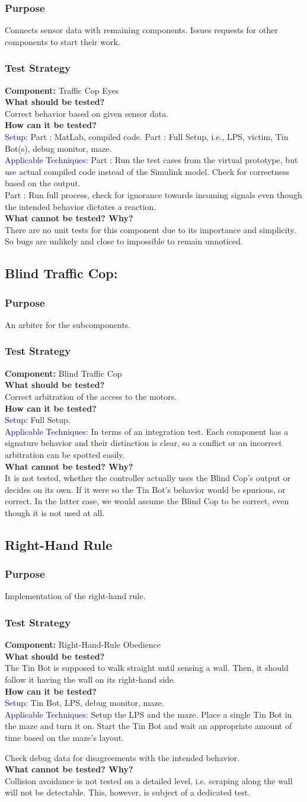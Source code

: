 \documentclass[a4paper,parskip,headheight=38pt]{scrartcl} %
\newcommand*{\rom}[1]{\uppercase\expandafter{\romannumeral #1\relax}}
\newcommand{\teststrat}[5]{
    \subsubsection{Test Strategy}
	\textbf{Component:} #1 \\
	\noindent\textbf{What should be tested?} \\
    \noindent #2 \\
	\noindent\textbf{How can it be tested?} \\
    \noindent\textcolor{blue}{Setup:} #3 \\
    \noindent\textcolor{blue}{Applicable Techniques:} #4 \\
	\noindent\textbf{What cannot be tested? Why?} \\
    \noindent #5
}
\newcommand{\ie}{i.e.}
\begin{document}
\subsubsection{Purpose}
Connects sensor data with remaining components. Issues requests for other components to start their work.
\teststrat{Traffic Cop Eyes}{
    Correct behavior based on given sensor data.
}{
    Part \rom{1}: MatLab, compiled code. Part \rom{2}: Full Setup, \ie, LPS,
    victim, Tin Bot(s), debug monitor, maze.
}{
    Part \rom{1}: Run the test cases from the virtual prototype, but use actual
    compiled code instead of the Simulink model. Check for correctness based
    on the output. \\
    Part \rom{2}: Run full process, check for ignorance towards incoming signals
    even though the intended behavior dictates a reaction. 
}{
    There are no unit tests for this component due to its importance and
    simplicity. So bugs are unlikely and close to impossible to remain
    unnoticed.
}
%
\subsection{Blind Traffic Cop:}
\subsubsection{Purpose}
An arbiter for the subcomponents.
\teststrat{Blind Traffic Cop}{
    Correct arbitration of the access to the motors.
}{
    Full Setup.
}{
    In terms of an integration test. Each component has a signature behavior and
    their distinction is clear, so a conflict or an incorrect arbitration can be
    spotted easily.
}{
    It is not tested, whether the controller actually uses the Blind Cop's
    output or decides on its own. If it were so the Tin Bot's behavior would be
    spurious, or correct. In the latter case, we would assume the Blind Cop to
    be correct, even though it is not used at all.
}
%
\subsection{Right-Hand Rule}
\subsubsection{Purpose}
Implementation of the right-hand rule.
\teststrat{Right-Hand-Rule Obedience}{
    The Tin Bot is supposed to walk straight until sensing a wall. Then, it
    should follow it having the wall on its right-hand side.
}{
    Tin Bot, LPS, debug monitor, maze.
}{
    Setup the LPS and the maze. Place a single Tin Bot in the maze and turn it
    on. Start the Tin Bot and wait an appropriate amount of time based on the
    maze's layout.

    Check debug data for disagreements with the intended behavior.
}{
    Collision avoidance is not tested on a detailed level, i.e. scraping along
    the wall will not be detectable. This, however, is subject of a dedicated
    test.
}
%
\end{document}
